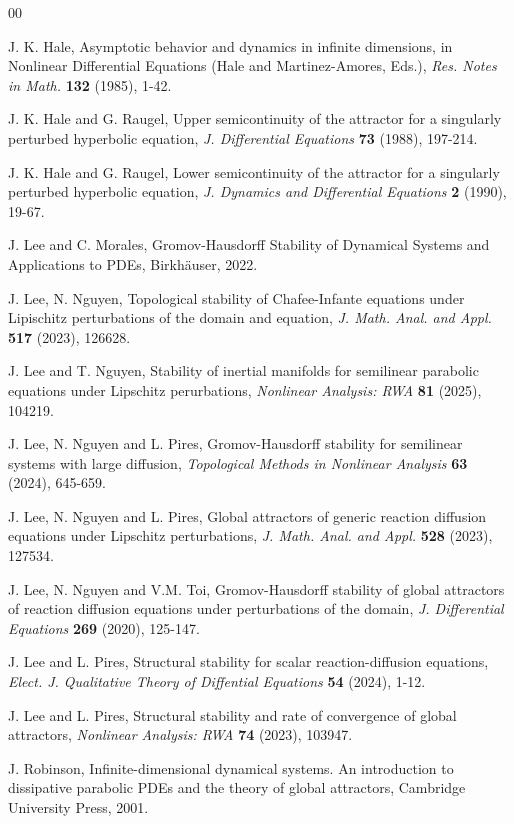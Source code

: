 \documentclass[11pt]{amsart}
\begin{document}
\begin{thebibliography}{00}

 J. K. Hale, Asymptotic behavior and dynamics in infinite dimensions, in Nonlinear Differential Equations (Hale and Martinez-Amores, Eds.), \emph{Res. Notes in Math.} {\bf 132} (1985), 1-42.

 J. K. Hale and G. Raugel, Upper semicontinuity of the attractor for a singularly perturbed hyperbolic equation, \emph{J. Differential Equations} {\bf 73} (1988), 197-214.

 J. K. Hale and G. Raugel, Lower semicontinuity of the attractor for a singularly perturbed hyperbolic equation, \emph{J. Dynamics and Differential Equations} {\bf 2} (1990), 19-67.


 J. Lee and C. Morales, Gromov-Hausdorﬀ Stability of Dynamical Systems and Applications to PDEs, Birkhäuser, 2022.

 J. Lee, N. Nguyen, Topological stability of Chafee-Infante equations under Lipischitz perturbations of the domain and equation,  \emph{J. Math. Anal. and Appl.} {\bf 517} (2023), 126628.

 J. Lee and T. Nguyen, Stability of inertial manifolds for semilinear parabolic equations under Lipschitz perurbations, \emph{Nonlinear Analysis: RWA} {\bf 81} (2025), 104219.

 J. Lee, N. Nguyen and L. Pires, Gromov-Hausdorff stability for semilinear systems with large diffusion,  \emph{Topological Methods in Nonlinear Analysis} {\bf 63} (2024), 645-659.

 J. Lee, N. Nguyen and L. Pires, Global attractors of generic reaction diffusion equations under Lipschitz perturbations,  \emph{J. Math. Anal. and Appl.} {\bf 528} (2023), 127534.

 J. Lee, N. Nguyen and V.M. Toi, Gromov-Hausdorff stability of global attractors of reaction diffusion equations under perturbations of the domain, \emph{J. Differential Equations} {\bf 269} (2020), 125-147.

 J. Lee and L. Pires, Structural stability for scalar reaction-diffusion equations,  \emph{Elect. J. Qualitative Theory of Diffential Equations} {\bf 54} (2024), 1-12.

 J. Lee and L. Pires, Structural stability and rate of convergence of global attractors, \emph{Nonlinear Analysis: RWA} {\bf 74} (2023), 103947.


J. Robinson, Infinite-dimensional dynamical systems. An introduction to dissipative parabolic PDEs and the
theory of global attractors, { Cambridge University Press,} 2001.
\end{thebibliography}
\end{document}
